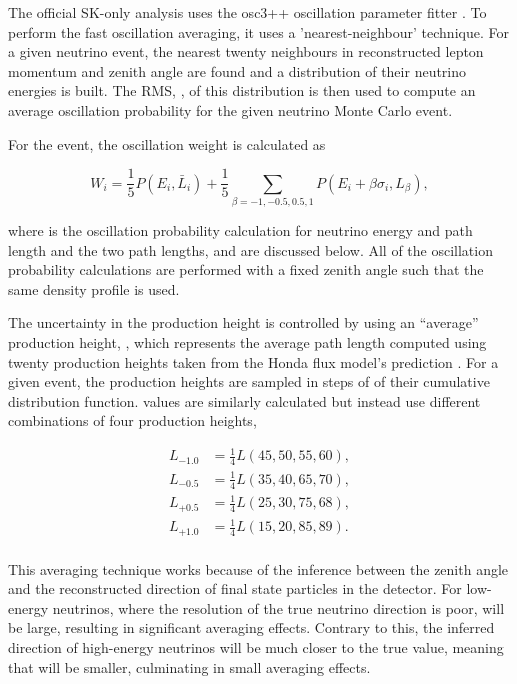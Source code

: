 The official SK-only analysis uses the osc3++ oscillation parameter fitter \cite{thesis_roger}. To perform the fast oscillation averaging, it uses a 'nearest-neighbour' technique. For a given neutrino event, the nearest twenty neighbours in reconstructed lepton momentum and zenith angle are found and a distribution of their neutrino energies is built. The RMS, \quickmath{\sigma}, of this distribution is then used to compute an average oscillation probability for the given neutrino Monte Carlo event. 

For the  event, the oscillation weight is calculated as

\begin{equation}
  W_{i} = \frac{1}{5} P(E_{i},\bar{L}_{i}) + \frac{1}{5} \sum_{\beta = -1, -0.5, 0.5, 1} P(E_{i} + \beta\sigma_{i},L_{\beta}),
\end{equation}

where  is the oscillation probability calculation for neutrino energy  and path length  and the two path lengths,  and  are discussed below. All of the oscillation probability calculations are performed with a fixed zenith angle such that the same density profile is used.

The uncertainty in the production height is controlled by using an ``average'' production height, , which represents the average path length computed using twenty production heights taken from the Honda flux model's prediction \cite{Honda:2011}. For a given event, the production heights are sampled in steps of  of their cumulative distribution function.  values are similarly calculated but instead use different combinations of four production heights,

\begin{equation}
  \begin{split}
    L_{-1.0} &= \frac{1}{4} L(45,50,55,60), \\
    L_{-0.5} &= \frac{1}{4} L(35,40,65,70), \\
    L_{+0.5} &= \frac{1}{4} L(25,30,75,68), \\
    L_{+1.0} &= \frac{1}{4} L(15,20,85,89). \\
  \end{split}
\end{equation}

This averaging technique works because of the inference between the zenith angle and the reconstructed direction of final state particles in the detector. For low-energy neutrinos, where the resolution of the true neutrino direction is poor,  will be large, resulting in significant averaging effects. Contrary to this, the inferred direction of high-energy neutrinos will be much closer to the true value, meaning that  will be smaller, culminating in small averaging effects.

